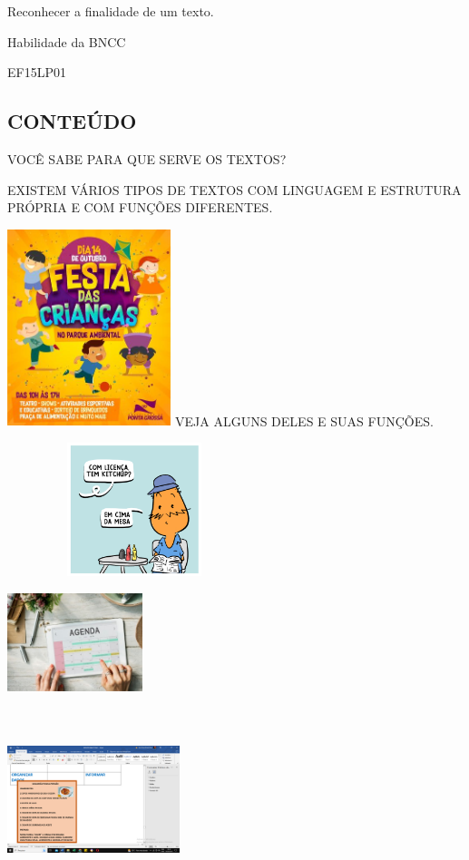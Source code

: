 Reconhecer a finalidade de um texto.

Habilidade da BNCC

EF15LP01

\subsection{CONTEÚDO}\label{conteuxfado-3}

VOCÊ SABE PARA QUE SERVE OS TEXTOS?

EXISTEM VÁRIOS TIPOS DE TEXTOS COM LINGUAGEM E ESTRUTURA PRÓPRIA E COM
FUNÇÕES DIFERENTES.

\includegraphics[width=1.87898in,height=2.25631in]{media/image86.jpeg}
VEJA ALGUNS DELES E SUAS FUNÇÕES.

\includegraphics[width=2.91667in,height=1.53611in]{media/image87.png}

\includegraphics[width=1.55208in,height=1.12778in]{media/image90.jpeg}

\includegraphics[width=1.97452in,height=2.09063in]{media/image91.png}


